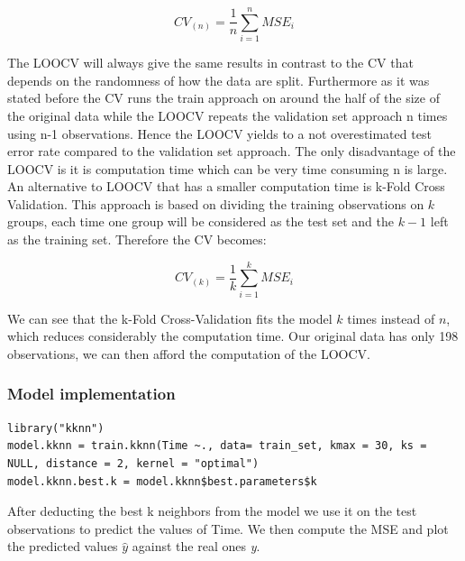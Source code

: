 \documentclass[]{report}
\begin{document}
\begin{center}
	$$CV_{(n)} = \frac{1}{n} \sum_{i=1}^{n} MSE_{i} $$
\end{center}

The LOOCV will always give the same results in contrast to the CV that depends on the randomness of how the data are split. Furthermore as it was stated before the CV runs the train approach on around the half of the size of the original data while the LOOCV repeats the validation set approach n times using n-1 observations. Hence the LOOCV yields to a not overestimated test error rate compared to the validation set approach. The only disadvantage of the LOOCV is it is computation time which can be very time consuming n is large.\\

An alternative to LOOCV that has a smaller computation time is k-Fold Cross Validation. This approach is based on dividing the training observations on $k$ groups, each time one group will be considered as the test set and the $k-1$ left as the training set. Therefore the CV becomes:

\begin{center}
	$$CV_{(k)} = \frac{1}{k} \sum_{i=1}^{k} MSE_{i} $$
\end{center}

We can see that the k-Fold Cross-Validation fits the model $k$ times instead of $n$, which reduces considerably the computation time. Our original data has only 198 observations, we can then afford the computation of the LOOCV. \\

\subsubsection{Model implementation}

\begin{lstlisting}
library("kknn")
model.kknn = train.kknn(Time ~., data= train_set, kmax = 30, ks = NULL, distance = 2, kernel = "optimal")
model.kknn.best.k = model.kknn$best.parameters$k
\end{lstlisting}

After deducting the best k neighbors from the model we use it on the test observations to predict the values of Time. 
We then compute the MSE and plot the predicted values $\hat{y}$ against the real ones \textit{y}.
\end{document}
